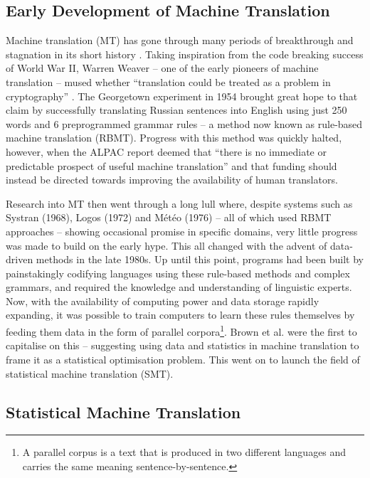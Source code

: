 \documentclass[11pt]{article}
\begin{document}
\subsection{Early Development of Machine Translation}
Machine translation (MT) has gone through many periods of breakthrough and stagnation in its short history \cite[p. 30]{koehn2020}. Taking inspiration from the code breaking success of World War II, Warren Weaver -- one of the early pioneers of machine translation -- mused whether “translation could be treated as a problem in cryptography” \citeyearpar{weaver}. The Georgetown experiment in 1954 brought great hope to that claim by successfully translating Russian sentences into English using just 250 words and 6 preprogrammed grammar rules \citep{Hutchins2006TheFP} -- a method now known as rule-based machine translation (RBMT). Progress with this method was quickly halted, however, when the ALPAC report \citeyearpar{alpac} deemed that “there is no immediate or predictable prospect of useful machine translation” and that funding should instead be directed towards improving the availability of human translators. 

\bigskip

Research into MT then went through a long lull where, despite systems such as Systran (1968), Logos (1972) and Météo (1976) -- all of which used RBMT approaches -- showing occasional promise in specific domains, very little progress was made to build on the early hype. This all changed with the advent of data-driven methods in the late 1980s. Up until this point, programs had been built by painstakingly codifying languages using these rule-based methods and complex grammars, and required the knowledge and understanding of linguistic experts. Now, with the availability of computing power and data storage rapidly expanding, it was possible to train computers to learn these rules themselves by feeding them data in the form of parallel corpora\footnote{A parallel corpus is a text that is produced in two different languages and carries the same meaning sentence-by-sentence.}. Brown et al. \citeyearpar{brown-etal-1990-statistical} were the first to capitalise on this -- suggesting using data and statistics in machine translation to frame it as a statistical optimisation problem. This went on to launch the field of statistical machine translation (SMT).

\subsection{Statistical Machine Translation}
\end{document}
